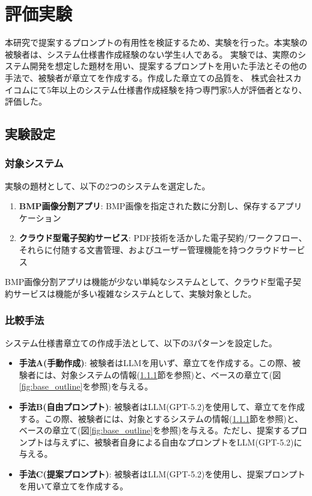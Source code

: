 \chapter{評価実験}\label{cha:Evaluation}

本研究で提案するプロンプトの有用性を検証するため、実験を行った。本実験の被験者は、システム仕様書作成経験のない学生4人である。
実験では、実際のシステム開発を想定した題材を用い、提案するプロンプトを用いた手法とその他の手法で、被験者が章立てを作成する。作成した章立ての品質を、
株式会社スカイコム\cite{skycom}にて5年以上のシステム仕様書作成経験を持つ専門家5人が評価者となり、評価した。


\section{実験設定}

\subsection{対象システム}
\label{sec:target_system}

実験の題材として、以下の2つのシステムを選定した。
\begin{enumerate}
    \item \textbf{BMP画像分割アプリ}: BMP画像を指定された数に分割し、保存するアプリケーション
    \item \textbf{クラウド型電子契約サービス}: PDF技術を活かした電子契約/ワークフロー、それらに付随する文書管理、およびユーザー管理機能を持つクラウドサービス
\end{enumerate}

BMP画像分割アプリは機能が少ない単純なシステムとして、クラウド型電子契約サービスは機能が多い複雑なシステムとして、実験対象とした。

\subsection{比較手法}

システム仕様書章立ての作成手法として、以下の3パターンを設定した。
\begin{itemize}
    \item \textbf{手法A(手動作成)}: 被験者はLLMを用いず、章立てを作成する。この際、被験者には、対象システムの情報(\ref{sec:target_system}節を参照)と、ベースの章立て(図\ref{fig:base_outline}を参照)を与える。
    \item \textbf{手法B(自由プロンプト)}: 被験者はLLM(GPT-5.2)を使用して、章立てを作成する。この際、被験者には、対象とするシステムの情報(\ref{sec:target_system}節を参照)と、ベースの章立て(図\ref{fig:base_outline}を参照)を与える。ただし、提案するプロンプトは与えずに、被験者自身による自由なプロンプトをLLM(GPT-5.2)に与える。
    \item \textbf{手法C(提案プロンプト)}: 被験者はLLM(GPT-5.2)を使用し、提案プロンプトを用いて章立てを作成する。
\end{itemize}

